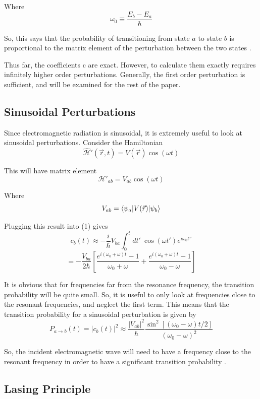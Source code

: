 \documentclass{article}
\renewcommand{\H}{\mathcal{H}}
\begin{document}
Where 
\[ \omega_0 \equiv \frac{E_b - E_a}{\hbar} \]

So, this says that the probability of transitioning from state $a$ to state $b$ is proportional to the matrix element of the perturbation between the two states \cite{Griffiths}.

Thus far, the coefficients c are exact. However, to calculate them exactly requires infinitely higher order perturbations. Generally, the first order perturbation is sufficient, and will be examined for the rest of the paper.

\subsection*{Sinusoidal Perturbations}

Since electromagnetic radiation is sinusoidal, it is extremely useful to look at sinusoidal perturbations. Consider the Hamiltonian
\[ \hat{\H}'(\vec{r},t) = V(\vec{r})\cos(\omega t) \]

This will have matrix element 
\[ \H'_{ab} = V_{ab}\cos(\omega t) \]

Where 
\[ V_{ab} = \braket{\psi_a|V(\vec{r})|\psi_b} \]

Plugging this result into (1) gives
\[ c_b(t) \approx -\frac{i}{\hbar}V_{ba}\int_0^tdt'\ \cos(\omega t')e^{i\omega_0t''}  \]
\[ = -\frac{V_{ba}}{2\hbar}\left[ \frac{e^{i(\omega_0+\omega)t}-1}{\omega_0+\omega} + \frac{e^{i(\omega_0+\omega)t}-1}{\omega_0-\omega} \right] \]

It is obvious that for frequencies far from the resonance frequency, the transition probability will be quite small. So, it is useful to only look at frequencies close to the resonant frequencies, and neglect the first term. This means that the transition probability for a sinusoidal perturbation is given by \cite{Griffiths} 
\[ P_{a\to b}(t) = |c_b(t)|^2 \approx \frac{|V_{ab}|^2}{\hbar}\frac{\sin^2\left[(\omega_0-\omega)t/2\right]}{(\omega_0-\omega)^2} \]

So, the incident electromagnetic wave will need to have a frequency close to the resonant frequency in order to have a significant transition probability \cite{Griffiths}.



\subsection*{Lasing Principle}
\end{document}
